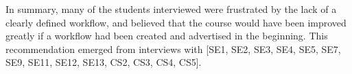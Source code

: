 In summary, many of the students interviewed were frustrated by the lack of a clearly defined workflow, and believed that the course would have been improved greatly if a workflow had been created and advertised in the beginning. This recommendation emerged from interviews with [SE1, SE2, SE3, SE4, SE5, SE7, SE9, SE11, SE12, SE13, CS2, CS3, CS4, CS5].







